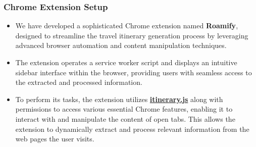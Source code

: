 \documentclass[conference]{IEEEtran}
\begin{document}
    \subsubsection{Chrome Extension Setup}
        \begin{itemize}
            \item We have developed a sophisticated Chrome extension named \textbf{Roamify}, designed to streamline the travel itinerary generation process by leveraging advanced browser automation and content manipulation techniques.
            \item The extension operates a service worker script and displays an intuitive sidebar interface within the browser, providing users with seamless access to the extracted and processed information.
            \item To perform its tasks, the extension utilizes \href{https://github.com/Roamify-Research/Extension/blob/main/src/scripts/itinerary.js}{\textbf{itinerary.js}} along with permissions to access various essential Chrome features, enabling it to interact with and manipulate the content of open tabs. This allows the extension to dynamically extract and process relevant information from the web pages the user visits.
        \end{itemize}
\end{document}
